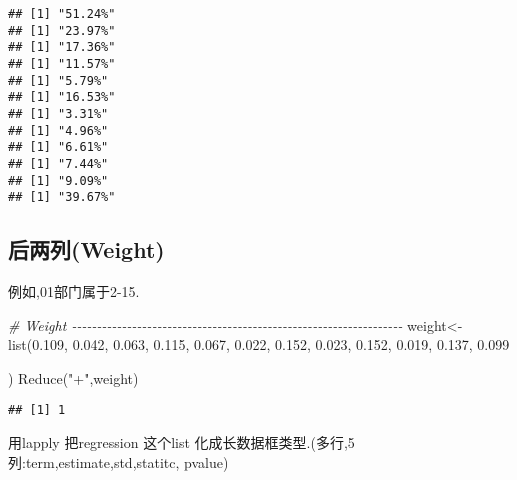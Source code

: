 \documentclass[
]{article}
\newenvironment{Shaded}{\begin{snugshade}}{\end{snugshade}}
\newcommand{\CommentTok}[1]{\textcolor[rgb]{0.56,0.35,0.01}{\textit{#1}}}
\newcommand{\ControlFlowTok}[1]{\textcolor[rgb]{0.13,0.29,0.53}{\textbf{#1}}}
\newcommand{\DecValTok}[1]{\textcolor[rgb]{0.00,0.00,0.81}{#1}}
\newcommand{\FloatTok}[1]{\textcolor[rgb]{0.00,0.00,0.81}{#1}}
\newcommand{\FunctionTok}[1]{\textcolor[rgb]{0.00,0.00,0.00}{#1}}
\newcommand{\NormalTok}[1]{#1}
\newcommand{\OtherTok}[1]{\textcolor[rgb]{0.56,0.35,0.01}{#1}}
\newcommand{\SpecialCharTok}[1]{\textcolor[rgb]{0.00,0.00,0.00}{#1}}
\newcommand{\StringTok}[1]{\textcolor[rgb]{0.31,0.60,0.02}{#1}}
\begin{document}
\begin{verbatim}
## [1] "51.24%"
## [1] "23.97%"
## [1] "17.36%"
## [1] "11.57%"
## [1] "5.79%"
## [1] "16.53%"
## [1] "3.31%"
## [1] "4.96%"
## [1] "6.61%"
## [1] "7.44%"
## [1] "9.09%"
## [1] "39.67%"
\end{verbatim}

\hypertarget{ux540eux4e24ux5217weight}{%
\subsection{后两列(Weight)}\label{ux540eux4e24ux5217weight}}

例如,01部门属于2-15.

\begin{Shaded}
\begin{Highlighting}[]
\CommentTok{\# Weight {-}{-}{-}{-}{-}{-}{-}{-}{-}{-}{-}{-}{-}{-}{-}{-}{-}{-}{-}{-}{-}{-}{-}{-}{-}{-}{-}{-}{-}{-}{-}{-}{-}{-}{-}{-}{-}{-}{-}{-}{-}{-}{-}{-}{-}{-}{-}{-}{-}{-}{-}{-}{-}{-}{-}{-}{-}{-}{-}{-}{-}{-}{-}{-}{-}{-}}
\NormalTok{weight}\OtherTok{\textless{}{-}} \FunctionTok{list}\NormalTok{(}\FloatTok{0.109}\NormalTok{,    }\FloatTok{0.042}\NormalTok{,  }\FloatTok{0.063}\NormalTok{,  }\FloatTok{0.115}\NormalTok{,  }\FloatTok{0.067}\NormalTok{,  }\FloatTok{0.022}\NormalTok{,  }\FloatTok{0.152}\NormalTok{,  }\FloatTok{0.023}\NormalTok{,  }\FloatTok{0.152}\NormalTok{,  }\FloatTok{0.019}\NormalTok{,  }\FloatTok{0.137}\NormalTok{,  }\FloatTok{0.099}
              
\NormalTok{)}
\FunctionTok{Reduce}\NormalTok{(}\StringTok{"+"}\NormalTok{,weight)}
\end{Highlighting}
\end{Shaded}

\begin{verbatim}
## [1] 1
\end{verbatim}

用lapply 把regression 这个list
化成长数据框类型.(多行,5列:term,estimate,std,statitc, pvalue)

\begin{Shaded}
\end{Shaded}
\end{document}
